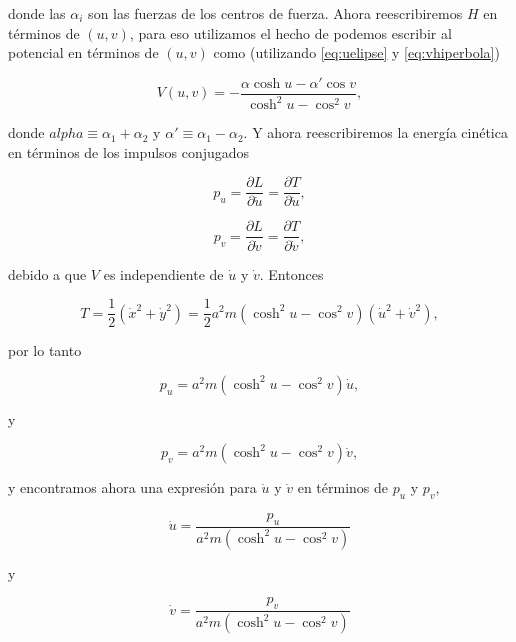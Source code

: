 \documentclass[a4paper,10pt]{article}
\numberwithin{equation}{section}
\begin{document}
donde las $\alpha_i$ son las fuerzas de los centros de fuerza. Ahora reescribiremos 
$H$ en términos de $(u,v)$, para eso utilizamos el hecho de podemos escribir al potencial 
en términos de $(u,v)$ como (utilizando \eqref{eq:uelipse} y \eqref{eq:vhiperbola})

\begin{equation}
 V(u,v) = - \frac{\alpha \cosh{u} - \alpha'\cos{v}}{\cosh^2{u}- \cos^2{v}},
\end{equation}

donde $alpha \equiv \alpha_1 + \alpha_2$ y $\alpha' \equiv \alpha_1 - \alpha_2$. Y ahora 
reescribiremos la energía cinética en términos de los impulsos conjugados 

\begin{equation}
 p_u = \frac{\partial L}{\partial \dot{u}} = \frac{\partial T}{\partial \dot{u}},
\end{equation}

\begin{equation}
 p_v = \frac{\partial L}{\partial \dot{v}} = \frac{\partial T}{\partial \dot{v}},
\end{equation}

debido a que $V$ es independiente de $\dot{u}$ y $\dot{v}$. Entonces 

\begin{equation}
 T = \frac{1}{2} (\dot{x}^2 + \dot{y}^2) = \frac{1}{2}a^2m(\cosh^2{u} - \cos^2{v})
 (\dot{u}^2+\dot{v}^2),
\end{equation}

por lo tanto

\begin{equation}
 p_u = a^2m(\cosh^2{u} - \cos^2{v})\dot{u},
\end{equation}

y 

\begin{equation}
 p_v = a^2m(\cosh^2{u} - \cos^2{v})\dot{v},
\end{equation}

y encontramos ahora una expresión para $\dot{u}$ y $\dot{v}$ en términos de 
$p_u$ y $p_v$, 

\begin{equation}
 \dot{u} = \frac{p_u}{a^2m(\cosh^2{u} - \cos^2{v})}
\end{equation}

y 

\begin{equation}
 \dot{v} = \frac{p_v}{a^2m(\cosh^2{u} - \cos^2{v})}
\end{equation}
\end{document}
